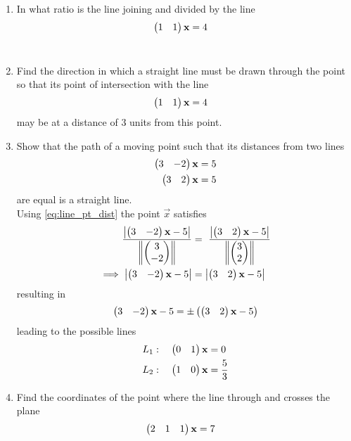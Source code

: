 \documentclass[journal,12pt,twocolumn]{IEEEtran}
\renewcommand\thesection{\arabic{section}}
\begin{document}
\begin{enumerate}[label=\thesection.\arabic*.,ref=\thesection.\theenumi]
\item In what ratio is the line joining  and  divided by the line
%
\begin{align}
\begin{pmatrix}1 & 1\end{pmatrix}\mathbf{x} &= 4
\end{align}
%
\\
\solution
%
\item Find the direction in which a straight line must be drawn through the point  so that its point of intersection with the line 
%
\begin{align}
\begin{pmatrix}1 & 1\end{pmatrix}\mathbf{x} &= 4
\end{align}
%
may be at a distance of 3 units from this point.
\\
\solution
%

\item Show that the path of a moving point such that its distances from two lines
%
\begin{align}
\begin{pmatrix}3 & -2\end{pmatrix}\mathbf{x}  &= 5
\\
\begin{pmatrix}3 & 2\end{pmatrix}\mathbf{x}  &= 5
\end{align}
%
are  equal is a straight line.
%
\\
\solution Using \eqref{eq:line_pt_dist} the point $\vec{x}$ satisfies
%
\begin{align}
\frac{\left\vert\begin{pmatrix}3 & -2\end{pmatrix}\mathbf{x}  - 5\right\vert}{\left\lVert\begin{pmatrix}3 \\ -2\end{pmatrix}\right\rVert}
&=\
\frac{\left\vert\begin{pmatrix}3 & 2\end{pmatrix}\mathbf{x}  - 5\right\vert}{\left\lVert\begin{pmatrix}3 \\ 2\end{pmatrix}\right\rVert}
\\
\implies \left\vert\begin{pmatrix}3 & -2\end{pmatrix}\mathbf{x}  - 5\right\vert&=\left\vert\begin{pmatrix}3 & 2\end{pmatrix}\mathbf{x}  - 5\right\vert
\end{align}
%
resulting in 
%
\begin{align}
\begin{pmatrix}3 & -2\end{pmatrix}\mathbf{x}  - 5=\pm\left(\begin{pmatrix}3 & 2\end{pmatrix}\mathbf{x}  - 5\right)
\end{align}
%
leading to the possible lines
%
\begin{align}
L_1: \quad \begin{pmatrix}0 & 1\end{pmatrix}\mathbf{x}  &=0
\\
L_2: \quad \begin{pmatrix}1 & 0\end{pmatrix}\mathbf{x}  &=  \frac{5}{3}
\end{align}
%
\item Find the coordinates of the point where the line through  and  crosses the plane 
\begin{align}
\begin{pmatrix}2 & 1 & 1\end{pmatrix}\mathbf{x}&=7
\end{align}
%
\solution
%
\end{enumerate}
\end{document}
